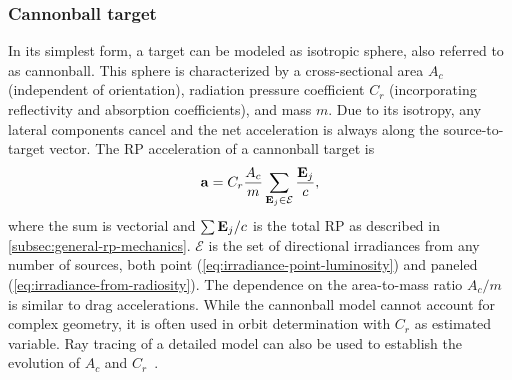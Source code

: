 \subsubsection{Cannonball target}
In its simplest form, a target can be modeled as isotropic sphere, also referred to as cannonball. This sphere is characterized by a cross-sectional area $A_c$ (independent of orientation), radiation pressure coefficient $C_r$ (incorporating reflectivity and absorption coefficients), and mass $m$. Due to its isotropy, any lateral components cancel and the net acceleration is always along the source-to-target vector. The \gls{RP} acceleration of a cannonball target is~\cite{Montenbruck2000}
\begin{align}
    \label{eq:cannonball-target}
    \vb a = C_r \frac{A_c}{m}\sum_{\vb E_j \in \mathcal{E}}\frac{\vb E_j}{c},
\end{align}
where the sum is vectorial and $\sum\vb E_j/c$ is the total \gls{RP} as described in \cref{subsec:general-rp-mechanics}. $\mathcal{E}$ is the set of directional irradiances from any number of sources, both point (\cref{eq:irradiance-point-luminosity}) and paneled (\cref{eq:irradiance-from-radiosity}). The dependence on the area-to-mass ratio $A_c/m$ is similar to drag accelerations. While the cannonball model cannot account for complex geometry, it is often used in orbit determination with $C_r$ as estimated variable. Ray tracing of a detailed model can also be used to establish the evolution of $A_c$ and $C_r$~\cite{Hattori2019}.


